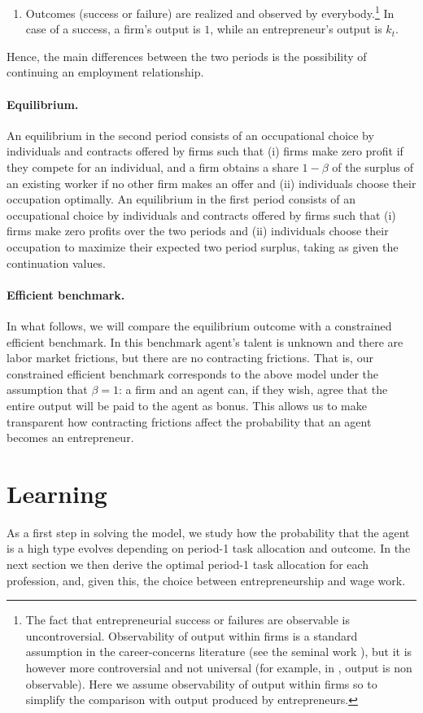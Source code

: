 \documentclass[12pt,american]{paper}
\theoremstyle{remark}
\begin{document}
\begin{enumerate}[(1)]
	\item Outcomes (success or failure) are realized and observed by everybody.\footnote{The fact that entrepreneurial success or failures are observable is uncontroversial. Observability of output within firms is a standard assumption in the career-concerns literature (see the seminal work \citealp{holmstrom1999managerial}), but it is however more controversial and not universal (for example, in \citealp{waldman1984job}, output is non observable). Here we assume observability of output within firms so to simplify the comparison with output produced by entrepreneurs.}  
In  case of a success, a firm's output is $1$, while an entrepreneur's output is $k_{t}$.
	\end{enumerate}
Hence, the main differences between the two periods is the possibility of continuing an employment relationship.


\paragraph{Equilibrium.}  An equilibrium in the second period consists of an occupational choice by individuals and contracts offered by firms such that (i)  firms make zero profit if they compete for an individual, and a firm obtains a share $1-\beta$ of the surplus of an existing worker if no other firm makes an offer and (ii) individuals choose their occupation optimally. An equilibrium in the first period consists of an occupational choice by individuals and contracts offered by firms such that (i) firms make zero profits over the two periods and (ii) individuals choose their occupation to maximize their expected two period surplus, taking as given the continuation values. 

\paragraph{Efficient benchmark.} In what follows, we will compare the equilibrium outcome with a constrained efficient benchmark. In this benchmark agent's talent is unknown and there are labor market frictions, but there are no contracting frictions. That is, our constrained efficient benchmark corresponds to the above model under the assumption that $\beta=1$: a firm and an agent can, if they wish, agree that the entire output will be paid to the agent as bonus. This allows us to make transparent how contracting frictions affect the probability that an agent becomes an entrepreneur.

 
\section{Learning\label{sec:learning}}
As a first step in solving the model, we study how the probability that the agent is a high type evolves depending on period-1 task allocation and outcome. In the next section we then derive the optimal period-1 task allocation for each profession, and, given this, the choice between entrepreneurship and wage work.
\end{document}
